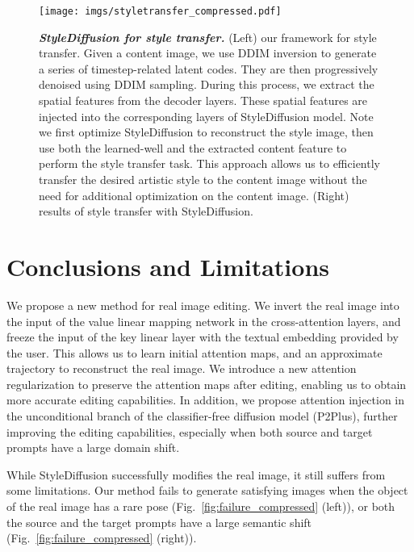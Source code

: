 \documentclass[twocolumn]{svjour3}          \smartqed  \usepackage{graphicx}
\begin{document}
\begin{figure*}[t]
\centering
\texttt{[image: imgs/styletransfer\_compressed.pdf]}
        \vspace{-2mm}
        \caption{\textit{\textbf{StyleDiffusion for style transfer.}} (Left) our framework for style transfer. Given a content image, we use DDIM inversion to generate a series of timestep-related latent codes. They are then progressively denoised using DDIM sampling. During this
process, we extract the spatial features from the decoder layers. These  spatial features are injected into the corresponding layers of StyleDiffusion model. Note we first optimize StyleDiffusion to reconstruct the style image, then use both the learned-well  and the extracted content feature to perform the style transfer task.  
This approach allows us to efficiently transfer the desired artistic style to the content image without the need for additional optimization on the content image. (Right) results of style transfer with StyleDiffusion.
        \vspace{2mm}}
    \label{fig:styletransfer}
\end{figure*}


\section{Conclusions and Limitations} 
We propose a new method for real image editing.  We invert the real image into the input of the value linear mapping network in the cross-attention layers, and freeze the input of the key linear  layer with the textual embedding provided by the user. This allows us to learn initial attention maps, and an approximate trajectory to reconstruct the real image.  We introduce a new attention regularization to preserve the attention maps after editing, enabling us to obtain more accurate editing capabilities. In addition, we propose attention injection in the unconditional branch of the classifier-free diffusion model (P2Plus), further improving the editing capabilities, especially when both source and target prompts have a large domain shift. 

While StyleDiffusion successfully modifies the real image, it still suffers from some limitations.  Our method fails to generate satisfying images when the object of the real image has a rare pose (Fig.~\ref{fig:failure_compressed} (left)), or both the source and the target prompts have a large semantic shift (Fig.~\ref{fig:failure_compressed} (right)).


      
\end{document}
